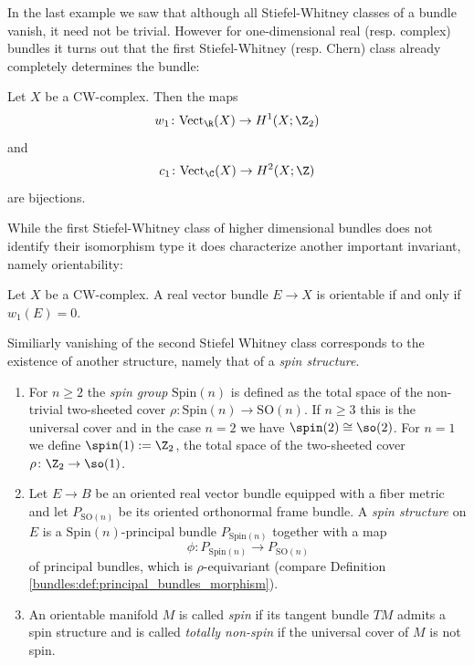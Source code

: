 In the last example we saw that although all Stiefel-Whitney classes of a bundle vanish, it need not be trivial. However for one-dimensional real (resp. complex) bundles it turns out that the first Stiefel-Whitney (resp. Chern) class already completely determines the bundle:

\begin{theorem}
    \label{bundles:thm:line_bundles_determined_by_chern_class}
    Let $X$ be a CW-complex. Then the maps 
    $$w_1 \colon \mathrm{Vect}_\R(X) \to H^1(X;\Z_2)$$ 
    and 
    $$c_1 \colon \mathrm{Vect}_\C(X) \to H^2(X;\Z)$$ 
    are bijections. 
\end{theorem}

While the first Stiefel-Whitney class of higher dimensional bundles does not identify their isomorphism type it does characterize another important invariant, namely orientability:

\begin{proposition}
    \label{bundles:prop:orientable_iff_w1_vanishes}
    Let $X$ be a CW-complex. A real vector bundle $E \to X$ is orientable if and only if $w_1(E) = 0$.
\end{proposition}

Similiarly vanishing of the second Stiefel Whitney class corresponds to the existence of another structure, namely that of a \textit{spin structure}. 

\begin{definition}
    \begin{enumerate}[label=(\roman*)]
        \item For $n \geq 2$ the \textit{spin group} $\mathrm{Spin}(n)$ is defined as the total space of the non-trivial two-sheeted cover $\rho \colon \mathrm{Spin}(n) \to \mathrm{SO}(n)$. If $n \geq 3$ this is the universal cover and in the case $n=2$ we have $\spin(2) \cong \so(2)$. For $n=1$ we define $\spin(1) := \Z_2$, the total space of the two-sheeted cover $\rho \colon \Z_2 \to \so(1)$.
        \item Let $E \to B$ be an oriented real vector bundle equipped with a fiber metric and let $P_{\mathrm{SO}(n)}$ be its oriented orthonormal frame bundle. A \textit{spin structure} on $E$ is a $\mathrm{Spin}(n)$-principal bundle $P_{\mathrm{Spin}(n)}$ together with a map 
        \[
        \phi \colon P_{\mathrm{Spin}(n)} \to P_{\mathrm{SO}(n)}
        \]
        of principal bundles, which is $\rho$-equivariant (compare Definition \ref{bundles:def:principal_bundles_morphism}).
        \item An orientable manifold $M$ is called \textit{spin} if its tangent bundle $TM$ admits a spin structure and is called \textit{totally non-spin} if the universal cover of $M$ is not spin.
    \end{enumerate}
\end{definition}

